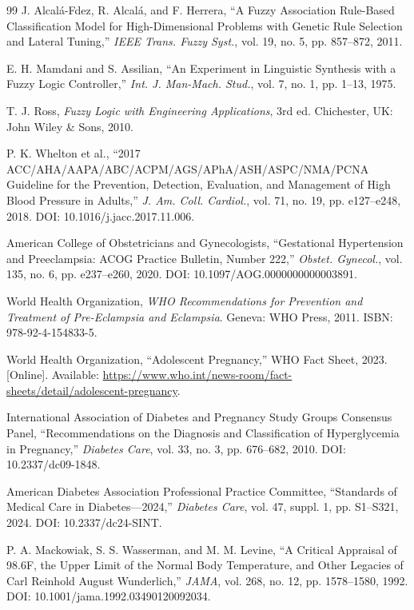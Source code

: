 \documentclass[11pt]{article}
\begin{document}
{\begin{thebibliography}{99}
        J. Alcal\'a-Fdez, R. Alcal\'a, and F. Herrera, ``A Fuzzy Association Rule-Based Classification Model for High-Dimensional Problems with Genetic Rule Selection and Lateral Tuning,'' \textit{IEEE Trans. Fuzzy Syst.}, vol. 19, no. 5, pp. 857--872, 2011.

        E. H. Mamdani and S. Assilian, ``An Experiment in Linguistic Synthesis with a Fuzzy Logic Controller,'' \textit{Int. J. Man-Mach. Stud.}, vol. 7, no. 1, pp. 1--13, 1975.

        T. J. Ross, \textit{Fuzzy Logic with Engineering Applications}, 3rd ed. Chichester, UK: John Wiley \& Sons, 2010.

P. K. Whelton et al., ``2017 ACC/AHA/AAPA/ABC/ACPM/AGS/APhA/ASH/ASPC/NMA/PCNA Guideline for the Prevention, Detection, Evaluation, and Management of High Blood Pressure in Adults,'' \textit{J. Am. Coll. Cardiol.}, vol. 71, no. 19, pp. e127--e248, 2018. DOI: 10.1016/j.jacc.2017.11.006.

American College of Obstetricians and Gynecologists, ``Gestational Hypertension and Preeclampsia: ACOG Practice Bulletin, Number 222,'' \textit{Obstet. Gynecol.}, vol. 135, no. 6, pp. e237--e260, 2020. DOI: 10.1097/AOG.0000000000003891.

World Health Organization, \textit{WHO Recommendations for Prevention and Treatment of Pre-Eclampsia and Eclampsia}. Geneva: WHO Press, 2011. ISBN: 978-92-4-154833-5.

World Health Organization, ``Adolescent Pregnancy,'' WHO Fact Sheet, 2023. [Online]. Available: \url{https://www.who.int/news-room/fact-sheets/detail/adolescent-pregnancy}.

International Association of Diabetes and Pregnancy Study Groups Consensus Panel, ``Recommendations on the Diagnosis and Classification of Hyperglycemia in Pregnancy,'' \textit{Diabetes Care}, vol. 33, no. 3, pp. 676--682, 2010. DOI: 10.2337/dc09-1848.

American Diabetes Association Professional Practice Committee, ``Standards of Medical Care in Diabetes---2024,'' \textit{Diabetes Care}, vol. 47, suppl. 1, pp. S1--S321, 2024. DOI: 10.2337/dc24-SINT.

P. A. Mackowiak, S. S. Wasserman, and M. M. Levine, ``A Critical Appraisal of 98.6\textdegree F, the Upper Limit of the Normal Body Temperature, and Other Legacies of Carl Reinhold August Wunderlich,'' \textit{JAMA}, vol. 268, no. 12, pp. 1578--1580, 1992. DOI: 10.1001/jama.1992.03490120092034.


\end{thebibliography}}
\end{document}
